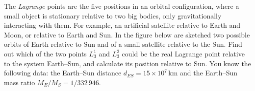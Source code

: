 The \textit{Lagrange} points are the five positions in an orbital
configuration, where a small object is stationary relative to two big bodies,
only gravitationally interacting with them. For example, an artificial
satellite relative to Earth and Moon, or relative to Earth and Sun. In the
figure below are sketched two possible orbits of Earth relative to Sun and of
a small satellite relative to the Sun. Find out which of the two points
$L_3^1$ and $L_3^2$ could be the real Lagrange point relative to the system
Earth--Sun, and calculate its position relative to Sun. You know the following
data: the Earth--Sun distance $d_{ES} = 15 \times 10^{7}$\,km and the
Earth--Sun mass ratio $M_E/M_S = 1/332\,946$.

